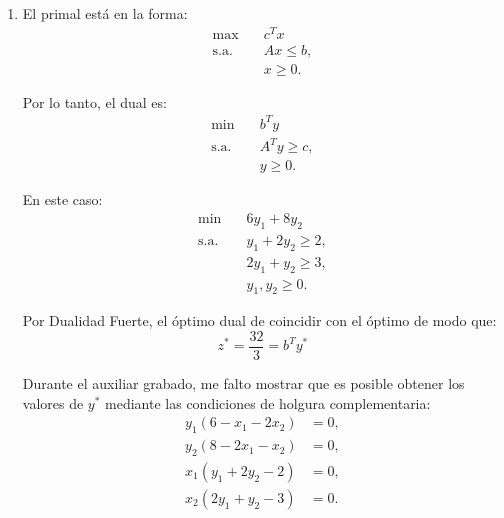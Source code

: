 \begin{enumerate}
La nueva base es
\begin{equation}
B_2=\{x_2,x_1\}.
\end{equation}

\textbf{Iteración 2}
Dado que los costos reducidos de las variables no básicas $s_1$ y $s_2$ son positivas, la solución encontrada es óptima para el problema.

\item
El primal está en la forma:
\begin{equation}
\begin{aligned}
\max \quad & c^Tx\\
\text{s.a.}\quad & Ax\leq b,\\
& x\geq 0.
\end{aligned}
\end{equation}

Por lo tanto, el dual es:
\begin{equation}
\begin{aligned}
\min \quad & b^Ty\\
\text{s.a.}\quad & A^Ty\geq c,\\
& y\geq 0.
\end{aligned}
\end{equation}

En este caso:
\begin{equation}
\begin{aligned}
\min \quad & 6y_1+8y_2\\
\text{s.a.}\quad
& y_1+2y_2 \geq 2,\\
& 2y_1+y_2 \geq 3,\\
& y_1,y_2 \geq 0.
\end{aligned}
\end{equation}

Por Dualidad Fuerte, el óptimo dual de coincidir con el óptimo de modo que:
\begin{equation}
    z^*=\frac{32}{3}=b^Ty^* 
\end{equation}

Durante el auxiliar grabado, me falto mostrar que es posible obtener los valores de $y^*$ mediante las condiciones de holgura complementaria:
\begin{equation}
\begin{aligned}
y_1(6-x_1-2x_2) &= 0,\\
y_2(8-2x_1-x_2) &= 0,\\
x_1(y_1+2y_2-2) &= 0,\\
x_2(2y_1+y_2-3) &= 0.
\end{aligned}
\end{equation}


\end{enumerate}
